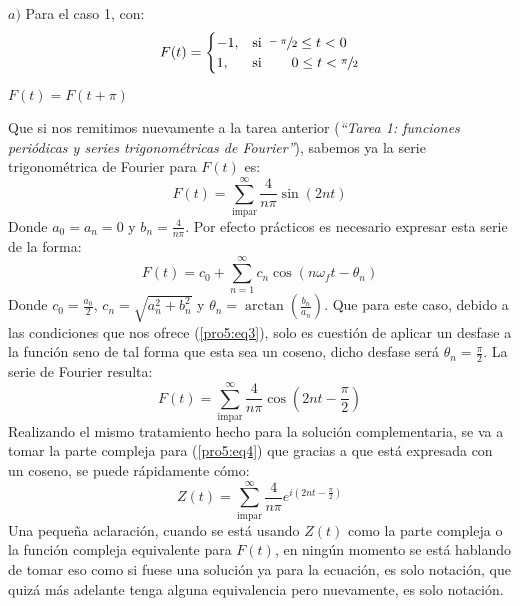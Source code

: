 \begin{multicols}{2}
$a)$ Para el caso 1, con:
\begin{equation*}
    F(t) =
    \begin{cases}
    -1,&\text{si } \sfrac{-\pi}{2} \leq t < 0\\
    1,&\text{si } \hspace{18pt} 0 \leq t < \sfrac{\pi}{2}
    \end{cases}
\end{equation*}
\begin{center}$F(t)=F(t+\pi)$\end{center}
Que si nos remitimos nuevamente a la tarea anterior (\textit{``Tarea 1: funciones periódicas y series trigonométricas de Fourier''}), sabemos ya la serie trigonométrica de Fourier para $F(t)$ es:
\begin{equation}
    F(t) = \sum_{\mathrm{impar}}^{\infty} \frac{4}{n\pi} \sin\left(2nt\right)\label{pro5:eq3}
\end{equation}
Donde $a_0 = a_n = 0$ y $b_n = \frac{4}{n\pi}$. Por efecto prácticos es necesario expresar esta serie de la forma:
\begin{equation*}
    F(t) = c_0 + \sum_{n=1}^{\infty} c_n \cos\left(n\omega_f t - \theta_n\right) 
\end{equation*}
Donde $c_0 = \frac{a_0}{2}$, $c_n = \sqrt{a_{n}^{2} + b_{n}^{2}}$ y $\theta_n = \arctan\left(\frac{b_n}{a_n}\right)$. Que para este caso, debido a las condiciones que nos ofrece (\ref{pro5:eq3}), solo es cuestión de aplicar un desfase a la función seno de tal forma que esta sea un coseno, dicho desfase será $\theta_n = \frac{\pi}{2}$. La serie de Fourier resulta:
\begin{equation}
    F(t) = \sum_{\mathrm{impar}}^{\infty} \frac{4}{n\pi} \cos\left(2nt - \frac{\pi}{2}\right) \label{pro5:eq4}
\end{equation}
Realizando el mismo tratamiento hecho para la solución complementaria, se va a tomar la parte compleja para (\ref{pro5:eq4}) que gracias a que está expresada con un coseno, se puede rápidamente cómo:
\begin{equation}
    Z(t) = \sum_{\mathrm{impar}}^{\infty} \frac{4}{n\pi} e^{i\left(2nt - \frac{\pi}{2}\right)} \label{pro5:eq5}
\end{equation}
Una pequeña aclaración, cuando se está usando $Z(t)$ como la parte compleja o la función compleja equivalente para $F(t)$, en ningún momento se está hablando de tomar eso como si fuese una solución ya para la ecuación, es solo notación, que quizá más adelante tenga alguna equivalencia pero nuevamente, es solo notación.


\end{multicols}
